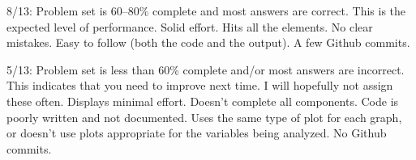 \documentclass[
]{article}
\begin{document}
8/13: Problem set is 60--80\% complete and most answers are correct.
This is the expected level of performance. Solid effort. Hits all the
elements. No clear mistakes. Easy to follow (both the code and the
output). A few Github commits.

5/13: Problem set is less than 60\% complete and/or most answers are
incorrect. This indicates that you need to improve next time. I will
hopefully not assign these often. Displays minimal effort. Doesn't
complete all components. Code is poorly written and not documented. Uses
the same type of plot for each graph, or doesn't use plots appropriate
for the variables being analyzed. No Github commits.
\end{document}
